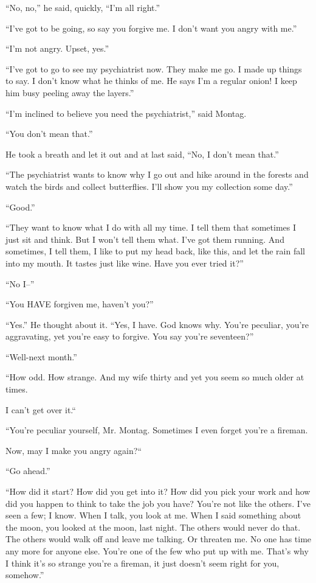 \documentclass[11pt,openany]{book}
\begin{document}
``No, no,'' he said, quickly, ``I'm all right.''

``I've got to be going, so say you forgive me. I don't want you angry with me.''

``I'm not angry. Upset, yes.''

``I've got to go to see my psychiatrist now. They make me go. I made up things to say. I don't know what he thinks of me. He says I'm a regular onion! I keep him busy peeling away the layers.''

``I'm inclined to believe you need the psychiatrist,'' said Montag.

``You don't mean that.''

He took a breath and let it out and at last said, ``No, I don't mean that.''

``The psychiatrist wants to know why I go out and hike around in the forests and watch the birds and collect butterflies. I'll show you my collection some day.''

``Good.''

``They want to know what I do with all my time. I tell them that sometimes I just sit and think. But I won't tell them what. I've got them running. And sometimes, I tell them, I like to put my head back, like this, and let the rain fall into my mouth. It tastes just like wine. Have you ever tried it?''

``No I--''

``You HAVE forgiven me, haven't you?''

``Yes.'' He thought about it. ``Yes, I have. God knows why. You're peculiar, you're aggravating, yet you're easy to forgive. You say you're seventeen?''

``Well-next month.''

``How odd. How strange. And my wife thirty and yet you seem so much older at times.

I can't get over it.``

``You're peculiar yourself, Mr. Montag. Sometimes I even forget you're a fireman.

Now, may I make you angry again?``

``Go ahead.''

``How did it start? How did you get into it? How did you pick your work and how did you happen to think to take the job you have? You're not like the others. I've seen a few; I know. When I talk, you look at me. When I said something about the moon, you looked at the moon, last night. The others would never do that. The others would walk off and leave me talking. Or threaten me. No one has time any more for anyone else. You're one of the few who put up with me. That's why I think it's so strange you're a fireman, it just doesn't seem right for you, somehow.''
\end{document}
